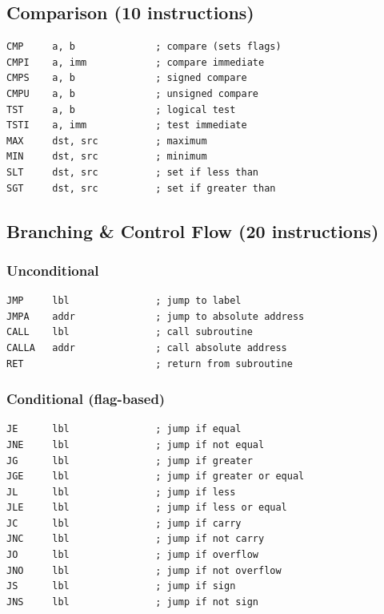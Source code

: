 \documentclass[12pt]{article}
\begin{document}
\subsection{Comparison (10 instructions)}

\begin{lstlisting}
CMP     a, b              ; compare (sets flags)
CMPI    a, imm            ; compare immediate
CMPS    a, b              ; signed compare
CMPU    a, b              ; unsigned compare
TST     a, b              ; logical test
TSTI    a, imm            ; test immediate
MAX     dst, src          ; maximum
MIN     dst, src          ; minimum
SLT     dst, src          ; set if less than
SGT     dst, src          ; set if greater than
\end{lstlisting}

\subsection{Branching \& Control Flow (20 instructions)}

\subsubsection{Unconditional}

\begin{lstlisting}
JMP     lbl               ; jump to label
JMPA    addr              ; jump to absolute address
CALL    lbl               ; call subroutine
CALLA   addr              ; call absolute address
RET                       ; return from subroutine
\end{lstlisting}

\subsubsection{Conditional (flag-based)}

\begin{lstlisting}
JE      lbl               ; jump if equal
JNE     lbl               ; jump if not equal
JG      lbl               ; jump if greater
JGE     lbl               ; jump if greater or equal
JL      lbl               ; jump if less
JLE     lbl               ; jump if less or equal
JC      lbl               ; jump if carry
JNC     lbl               ; jump if not carry
JO      lbl               ; jump if overflow
JNO     lbl               ; jump if not overflow
JS      lbl               ; jump if sign
JNS     lbl               ; jump if not sign
\end{lstlisting}
\end{document}
